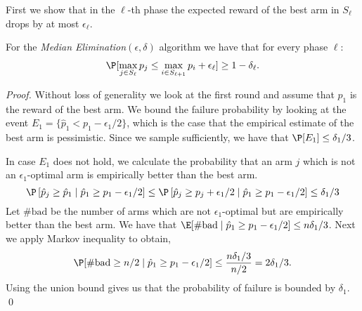 First we show that in the $\ell$-th phase the expected reward of
the best arm in $S_\ell$ drops by at most $\epsilon_\ell$.

\begin{lemma}
\label{lem-round-n} For the  {\em Median
Elimination}$(\epsilon,\delta)$ algorithm we have that for every phase $\ell$:
\begin{eqnarray*}
\P[\max_{j \in S_\ell}p_j \leq \max_{i \in S_{\ell+1}}p_i +
\epsilon_\ell] \geq 1 -\delta_\ell.
\end{eqnarray*}
\end{lemma}

\begin{proof}
Without loss of generality we look at the first round and assume
that $p_1$ is the reward of the best arm. We bound the failure
probability by looking at the event $E_1 = \{\hat{p}_1 < p_1 -
\epsilon_1 / 2\}$, which is the case that  the empirical estimate
of the best arm is pessimistic.
Since we sample sufficiently, we have that $\P[E_1]  \leq \delta_1
/ 3$.

In case $E_1$ does not hold, we calculate the probability that an
arm $j$ which is not an $\epsilon_1$-optimal arm is empirically better
than the best arm.
$$
\P\left[\hat{p}_j \geq \hat{p}_1  \;|\;\hat{p}_1 \geq p_1 -\epsilon_1
/2 \right] \leq
\P\left[ \hat{p}_j \geq p_j +  \epsilon_1 / 2  \;|\;
\hat{p}_1 \geq p_1 -\epsilon_1 / 2 \right] \leq \delta_1 / 3
$$
Let $\#\mbox{bad}$ be the number of arms which are not
$\epsilon_1$-optimal but are empirically better than the best arm.
We have that $\E[\#\mbox{bad} \;|\;\hat{p}_1 \geq p_1 -\epsilon_1
/2] \le n \delta_1/3$. Next we apply Markov inequality to obtain,
\begin{eqnarray*}
\P[\#\mbox{bad} \geq n/2 \;|\;\hat{p}_1 \geq p_1 -\epsilon_1 /2]
\leq \frac{ n\delta_1 / 3}{n / 2} = 2\delta_1 / 3.
\end{eqnarray*}
Using the union bound gives us that the probability of failure is
bounded by $\delta_1$. \qed
\end{proof}


